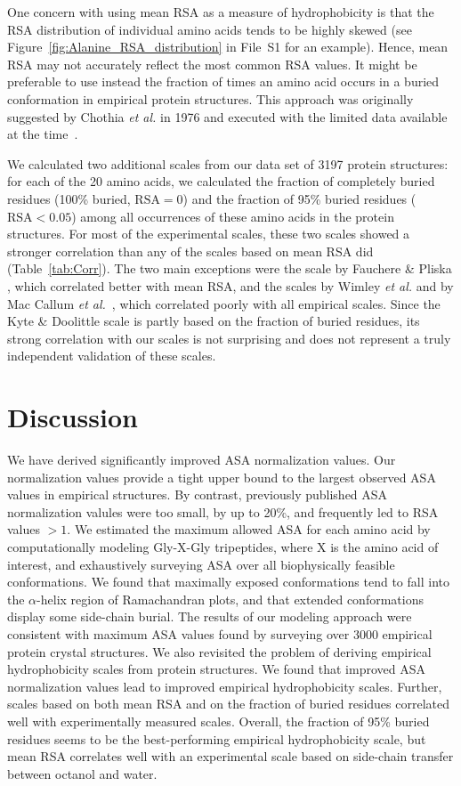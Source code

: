 \documentclass[11pt]{article}
\begin{document}
One concern with using mean RSA as a measure of hydrophobicity is that the RSA distribution of individual amino acids tends to be highly skewed (see Figure~\ref{fig:Alanine_RSA_distribution} in File~S1 for an example). Hence, mean RSA may not accurately reflect the most common RSA values. It might be preferable to use instead the fraction of times an amino acid occurs in a buried conformation in empirical protein structures. This approach was originally suggested by Chothia \emph{et al.} in 1976 and executed with the limited data available at the time~\cite{Chothia1976}.

We calculated two additional scales from our data set of 3197 protein structures: for each of the 20 amino acids, we calculated the fraction of completely buried residues (100\% buried, $\text{RSA}=0$) and the fraction of 95\% buried residues ($\text{RSA}<0.05$) among all occurrences of these amino acids in the protein structures. For most of the experimental scales, these two scales showed a stronger correlation than any of the scales based on mean RSA did (Table~\ref{tab:Corr}). The two main exceptions were the scale by Fauchere \& Pliska \cite{Fauchere1983}, which correlated better with mean RSA, and the scales by Wimley \emph{et al.} \cite{Wimley1996} and by Mac Callum \emph{et al.}~\cite{MacCallum2007}, which correlated poorly with all empirical scales. Since the Kyte \& Doolittle scale \cite{Kyte1981} is partly based on the fraction of buried residues, its strong correlation with our scales is not surprising and does not represent a truly independent validation of these scales.


\section*{Discussion}

We have derived significantly improved ASA normalization values. Our normalization values provide a tight upper bound to the largest observed ASA values in empirical structures. By contrast, previously published ASA normalization valules were too small, by up to 20\%, and frequently led to RSA values $>1$. We estimated the maximum allowed ASA for each amino acid by computationally modeling Gly-X-Gly tripeptides, where X is the amino acid of interest, and exhaustively surveying ASA over all biophysically feasible conformations. We found that maximally exposed conformations tend to fall into the $\alpha$-helix region of Ramachandran plots, and that extended conformations display some side-chain burial. The results of our modeling approach were consistent with maximum ASA values found by surveying over 3000 empirical protein crystal structures. We also revisited the problem of deriving empirical hydrophobicity scales from protein structures. We found that improved ASA normalization values lead to improved empirical hydrophobicity scales. Further, scales based on both mean RSA and on the fraction of buried residues correlated well with experimentally measured scales. Overall, the fraction of 95\% buried residues seems to be the best-performing empirical hydrophobicity scale, but mean RSA correlates well with an experimental scale based on side-chain transfer between octanol and water.
\end{document}
